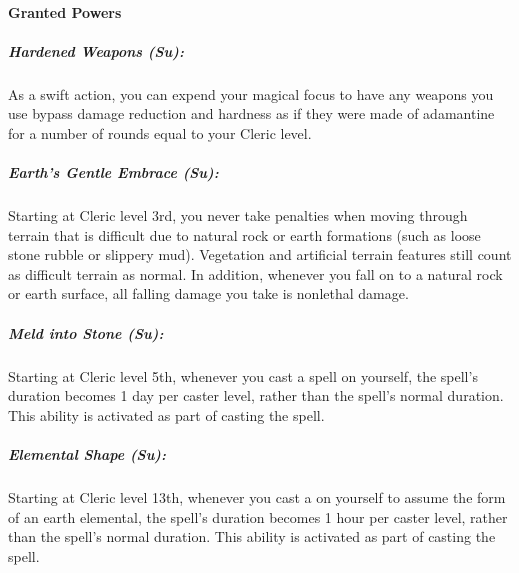 \paragraph{Granted Powers}
\subparagraph{Hardened Weapons (Su):}
As a swift action, you can expend your magical focus to have any weapons you use bypass damage reduction and hardness as if they were made of adamantine for a number of rounds equal to your Cleric level.
\subparagraph{Earth's Gentle Embrace (Su):}
Starting at Cleric level 3rd, you never take penalties when moving through terrain that is difficult due to natural rock or earth formations (such as loose stone rubble or slippery mud). Vegetation and artificial terrain features still count as difficult terrain as normal.
In addition, whenever you fall on to a natural rock or earth surface, all falling damage you take is nonlethal damage.
\subparagraph{Meld into Stone (Su):}
Starting at Cleric level 5th, whenever you cast a  spell on yourself, the spell's duration becomes 1 day per caster level, rather than the spell's normal duration.
This ability is activated as part of casting the spell.
\subparagraph{Elemental Shape (Su):}
Starting at Cleric level 13th, whenever you cast a  on yourself to assume the form of an earth elemental, 
the spell's duration becomes 1 hour per caster level, rather than the spell's normal duration.
This ability is activated as part of casting the spell.

